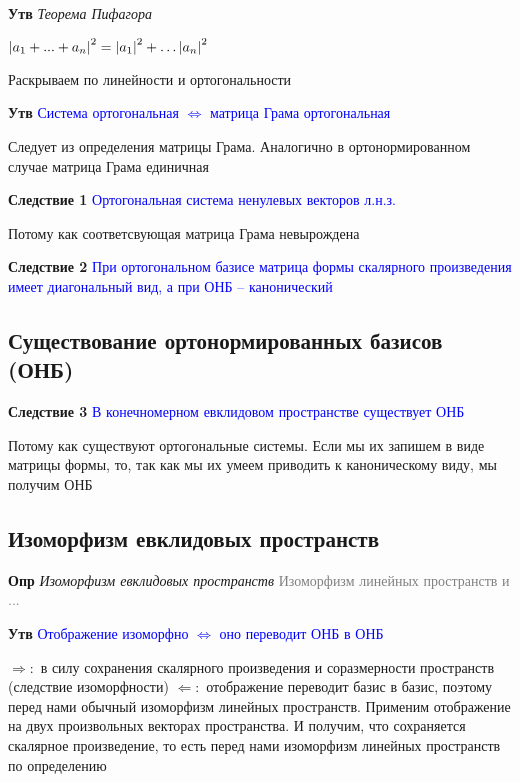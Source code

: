 \documentclass[a4paper, 14pt]{article}
\begin{document}
    \textbf{Утв} \textit{Теорема Пифагора}
    
    \textcolor{blue}{$\abs{a_1 + ... + a_n}^2 = \abs{a_1}^2 + \dots \abs{a_n}^2$}
    
    Раскрываем по линейности и ортогональности
    
    \textbf{Утв} \textcolor{blue}{Система ортогональная $\Leftrightarrow$ матрица Грама ортогональная}
    
    Следует из определения матрицы Грама.
    Аналогично в ортонормированном случае матрица Грама единичная
    
    \textbf{Следствие 1} \textcolor{blue}{Ортогональная система ненулевых векторов л.н.з.}
    
    Потому как соответсвующая матрица Грама невырождена
    
    \textbf{Следствие 2} \textcolor{blue}{При ортогональном базисе матрица формы скалярного произведения имеет
    диагональный вид, а при ОНБ -- канонический}
    
    \subsection{Существование ортонормированных базисов (ОНБ)}
    
    \textbf{Следствие 3} \textcolor{blue}{В конечномерном евклидовом пространстве существует ОНБ}
    
    Потому как существуют ортогональные системы.
    Если мы их запишем в виде матрицы формы, то, так как мы их умеем приводить к каноническому виду, мы получим ОНБ
    
    \subsection{Изоморфизм евклидовых пространств}
    
    \textbf{Опр} \textit{Изоморфизм евклидовых пространств} \textcolor{gray}{Изоморфизм линейных пространств и ...}
    
    \textbf{Утв} \textcolor{blue}{Отображение изоморфно $\Leftrightarrow$ оно переводит ОНБ в ОНБ}
    
    $\Rightarrow:$ в силу сохранения скалярного произведения и соразмерности пространств (следствие изоморфности)
    $\Leftarrow:$ отображение переводит базис в базис, поэтому перед нами обычный изоморфизм линейных
    пространств.
    Применим отображение на двух произвольных векторах пространства.
    И получим, что сохраняется скалярное произведение, то есть перед нами изоморфизм линейных пространств по определению
    
\end{document}

